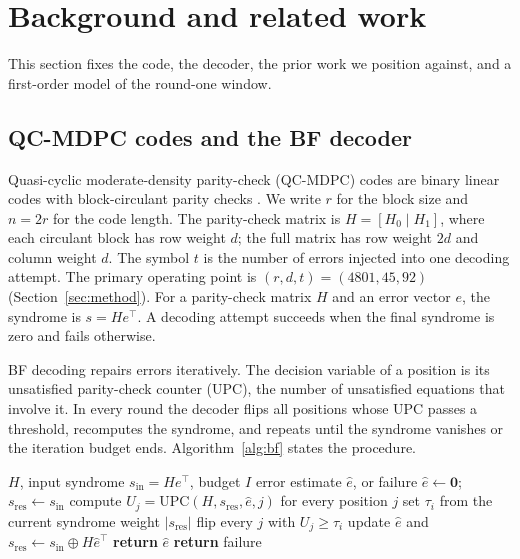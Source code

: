 \section{Background and related work}\label{sec:background}

This section fixes the code, the decoder, the prior work we position against, and a first-order model of the round-one window.

\subsection{QC-MDPC codes and the BF decoder}

Quasi-cyclic moderate-density parity-check (QC-MDPC) codes are binary linear codes with block-circulant parity checks \cite{misoczki2013mdpc}. We write $r$ for the block size and $n=2r$ for the code length. The parity-check matrix is $H=[H_0\mid H_1]$, where each circulant block has row weight $d$; the full matrix has row weight $2d$ and column weight $d$. The symbol $t$ is the number of errors injected into one decoding attempt. The primary operating point is $(r,d,t)=(4801,45,92)$ (Section~\ref{sec:method}). For a parity-check matrix $H$ and an error vector $e$, the syndrome is $s=He^{\top}$. A decoding attempt succeeds when the final syndrome is zero and fails otherwise.

BF decoding repairs errors iteratively. The decision variable of a position is its unsatisfied parity-check counter (UPC), the number of unsatisfied equations that involve it. In every round the decoder flips all positions whose UPC passes a threshold, recomputes the syndrome, and repeats until the syndrome vanishes or the iteration budget ends. Algorithm~\ref{alg:bf} states the procedure.

\begin{algorithm}[t]
\caption{Plain BF decoding}
\label{alg:bf}
\begin{algorithmic}[1]
\Require $H$, input syndrome $s_{\mathrm{in}}=He^{\top}$, budget $I$
\Ensure error estimate $\hat e$, or failure
\State $\hat e \gets \mathbf{0}$; $s_{\mathrm{res}} \gets s_{\mathrm{in}}$
  \State compute $U_j=\mathrm{UPC}(H,s_{\mathrm{res}},\hat e,j)$ for every position $j$
  \State set $\tau_i$ from the current syndrome weight $|s_{\mathrm{res}}|$
  \State flip every $j$ with $U_j\ge\tau_i$
  \State update $\hat e$ and $s_{\mathrm{res}}\gets s_{\mathrm{in}}\oplus H\hat e^{\top}$
    \State \textbf{return} $\hat e$
  \EndIf
\EndFor
\State \textbf{return} failure
\end{algorithmic}
\end{algorithm}

